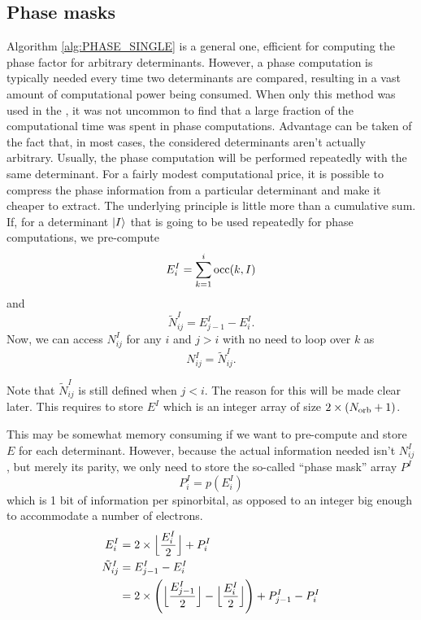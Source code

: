 \documentclass[./thesis.tex]{subfiles}
\begin{document}
\subsection{Phase masks}
\label{chap:PHASEMASK}

Algorithm \ref{alg:PHASE_SINGLE} is a general one, efficient for computing the phase factor for arbitrary determinants. However, a phase computation is typically needed every time two determinants are compared, resulting in a vast amount of computational power being consumed. When only this method was used in the \QP, it was not uncommon to find that a large fraction of the computational time was spent in phase computations.
Advantage can be taken of the fact that, in most cases, the considered determinants aren't actually arbitrary. Usually, the phase computation will be performed repeatedly with the same determinant. For a fairly modest computational price, it is possible to compress the phase information from a particular determinant and make it cheaper to extract. The underlying principle is little more than a cumulative sum. If, for a determinant $\ket{I}$ that is going to be used repeatedly for phase computations, we pre-compute
\begin{equation}
E^I_i = \sum_{k=1}^{i} {\text{occ}(k,I)}
\end{equation}
and
\begin{equation}
\tilde{N}^I_{ij} = E^I_{j-1} - E^I_{i}.
\end{equation}
Now, we can access $N^I_{ij}$ for any $i$ and $j>i$ with no need to loop over $k$ as
\begin{equation}
N^I_{ij} = \tilde N^I_{ij}.
\end{equation}


Note that $\tilde N^I_{ij}$ is still defined when $j<i$. The reason for this will be made clear later.
This requires to store $E^I$ which is an integer array of size $2 \times ({N_\text{orb}}+1)$. 


This may be somewhat memory consuming if we want to pre-compute and store $E$ for each determinant. However, because the actual information needed isn't $N^I_{ij}$, but merely its parity, we only need to store the so-called ``phase mask'' array $P^I$
\begin{equation}
\label{eq:phasemask}
P^I_i = p(E^I_i)
\end{equation}
which is 1 bit of information per spinorbital, as opposed to an integer big enough to accommodate a number of electrons.
\begin{align}
E^I_i & = 2 \times  \Big \lfloor \frac{E^I_i}{2} \Big \rfloor + P^I_i \\
\tilde N^I_{ij} & = E^I_{j-1} - E^I_{i} \\
 & = 2 \times \qty( \Big \lfloor \frac{E^I_{j-1}}{2} \Big \rfloor - \Big \lfloor \frac{E^I_{i}}{2} \Big \rfloor ) + P^I_{j-1} - P^I_{i}
\end{align}
	    
\end{document}
